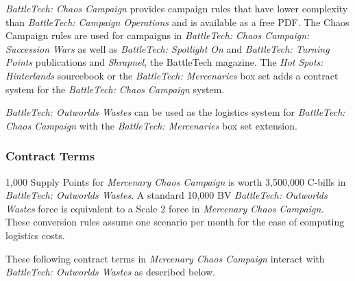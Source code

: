 \emph{BattleTech: Chaos Campaign} provides campaign rules that have lower complexity than \emph{BattleTech: Campaign Operations} and is available as a free PDF.
The Chaos Campaign rules are used for campaigns in \emph{BattleTech: Chaos Campaign: Succession Wars} as well as \emph{BattleTech: Spotlight On} and \emph{BattleTech: Turning Points} publications and \emph{Shrapnel}, the BattleTech magazine.
The \emph{Hot Spots: Hinterlands} sourcebook or the \emph{BattleTech: Mercenaries} box set adds a contract system for the \emph{BattleTech: Chaos Campaign} system.

\emph{BattleTech: Outworlds Wastes} can be used as the logistics system for \emph{BattleTech: Chaos Campaign} with the \emph{BattleTech: Mercenaries} box set extension.

\subsubsection{Contract Terms}

1,000 Supply Points for \emph{Mercenary Chaos Campaign} is worth 3,500,000 C-bills in \emph{BattleTech: Outworlds Wastes}.
A standard 10,000 BV \emph{BattleTech: Outworlds Wastes} force is equivalent to a Scale 2 force in \emph{Mercenary Chaos Campaign}.
These conversion rules assume one scenario per month for the ease of computing logistics costs.

These following contract terms in \emph{Mercenary Chaos Campaign} interact with \emph{BattleTech: Outworlds Wastes} as described below.

